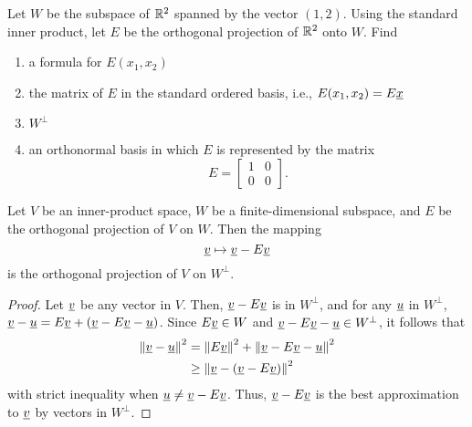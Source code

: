 \begin{problem}
Let $W$ be the subspace of $\mathbb{R}^2$ spanned by the vector $(1,2)$.
Using the standard inner product, let $E$ be the orthogonal projection of $\mathbb{R}^2$ onto $W$.
Find
\begin{enumerate}
\item a formula for $E(x_1, x_2)$
\item the matrix of $E$ in the standard ordered basis, i.e., $E(x_1, x_2) = E \underline{x}$
\item $W^{\bot}$
\item an orthonormal basis in which $E$ is represented by the matrix
\begin{equation*}
E = \left[ \begin{array}{cc} 1 & 0 \\ 0 & 0 \end{array} \right].
\end{equation*}
\end{enumerate}
\end{problem}

\begin{corollary}
Let $V$ be an inner-product space, $W$ be a finite-dimensional subspace, and $E$ be the orthogonal projection of $V$ on $W$.
Then the mapping
\begin{equation*}
\underline{v} \mapsto \underline{v} - E \underline{v}
\end{equation*}
is the orthogonal projection of $V$ on $W^{\bot}$.
\end{corollary}
\begin{proof}
Let $\underline{v}$ be any vector in $V$.
Then, $\underline{v} - E\underline{v}$ is in $W^{\bot}$, and for any $\underline{u}$ in $W^{\bot}$, $\underline{v} - \underline{u} = E \underline{v} + \left( \underline{v} - E \underline{v} - \underline{u} \right)$.
Since $E \underline{v} \in W$ and $\underline{v} - E \underline{v} - \underline{u} \in W^{\bot}$, it follows that
\begin{equation*}
\begin{split}
\left\| \underline{v} - \underline{u} \right\|^2 &= \left\| E \underline{v} \right\|^2 + \left\| \underline{v} - E \underline{v} - \underline{u} \right\|^2 \\
&\geq \left\| \underline{v} - \left( \underline{v} - E \underline{v} \right) \right\|^2
\end{split}
\end{equation*}
with strict inequality when $\underline{u} \neq \underline{v} - E \underline{v}$.
Thus, $\underline{v} - E \underline{v}$ is the best approximation to $\underline{v}$ by vectors in $W^{\bot}$.
\end{proof}

